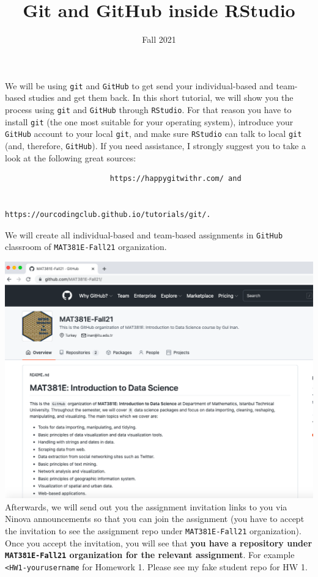 \documentclass[
  12pt,
]{article}
\title{Git and GitHub inside RStudio}
\author{}
\date{\vspace{-2.5em}Fall 2021}
\begin{document}
\maketitle

We will be using \texttt{git} and \texttt{GitHub} to get send your
individual-based and team-based studies and get them back. In this short
tutorial, we will show you the process using \texttt{git} and
\texttt{GitHub} through \texttt{RStudio}. For that reason you have to
install \texttt{git} (the one most suitable for your operating system),
introduce your \texttt{GitHub} account to your local \texttt{git}, and
make sure \texttt{RStudio} can talk to local \texttt{git} (and,
therefore, \texttt{GitHub}). If you need assistance, I strongly suggest
you to take a look at the following great sources:

\begin{verbatim}
                        https://happygitwithr.com/ and
                        
                        https://ourcodingclub.github.io/tutorials/git/.
\end{verbatim}

We will create all individual-based and team-based assignments in
\texttt{GitHub} classroom of \texttt{MAT381E-Fall21} organization.

\includegraphics[width=1\linewidth]{images/organization} Afterwards, we
will send out you the assignment invitation links to you via Ninova
announcements so that you can join the assignment (you have to accept
the invitation to see the assignment repo under \texttt{MAT381E-Fall21}
organization). Once you accept the invitation, you will see that
\textbf{you have a repository under \texttt{MAT381E-Fall21} organization
for the relevant assignment}. For example
\texttt{\textless{}HW1-yourusername} for Homework 1. Please see my fake
student repo for HW 1.
\end{document}
